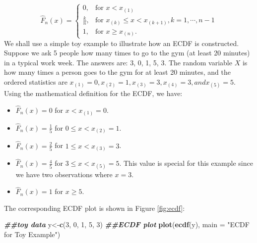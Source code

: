 \documentclass[
]{book}
\newenvironment{Shaded}{\begin{snugshade}}{\end{snugshade}}
\newcommand{\AttributeTok}[1]{\textcolor[rgb]{0.13,0.29,0.53}{#1}}
\newcommand{\DecValTok}[1]{\textcolor[rgb]{0.00,0.00,0.81}{#1}}
\newcommand{\DocumentationTok}[1]{\textcolor[rgb]{0.56,0.35,0.01}{\textbf{\textit{#1}}}}
\newcommand{\FunctionTok}[1]{\textcolor[rgb]{0.13,0.29,0.53}{\textbf{#1}}}
\newcommand{\NormalTok}[1]{#1}
\newcommand{\OtherTok}[1]{\textcolor[rgb]{0.56,0.35,0.01}{#1}}
\newcommand{\StringTok}[1]{\textcolor[rgb]{0.31,0.60,0.02}{#1}}
\providecommand{\tightlist}{%
  \setlength{\itemsep}{0pt}\setlength{\parskip}{0pt}}
\begin{document}
\[
 \hat{F}_n(x) = 
  \begin{cases} 
   0, & \text{for } x < x_{(1)} \\
   \frac{k}{n},       & \text{for } x_{(k)} \leq x < x_{(k+1)}, k = 1, \cdots, n-1\\
   1, & \text{for } x \geq x_{(n)}.
  \end{cases}
\]
We shall use a simple toy example to illustrate how an ECDF is constructed. Suppose we ask 5 people how many times to go to the gym (at least 20 minutes) in a typical work week. The answers are: 3, 0, 1, 5, 3. The random variable \(X\) is how many times a person goes to the gym for at least 20 minutes, and the ordered statistics are \(x_{(1)} = 0, x_{(2)} = 1, x_{(3)} = 3, x_{(4)} = 3, and x_{(5)} = 5\). Using the mathematical definition for the ECDF, we have:

\begin{itemize}
\tightlist
\item
  \(\hat{F}_n(x) = 0\) for \(x < x_{(1)} = 0\).
\item
  \(\hat{F}_n(x) = \frac{1}{5}\) for \(0 \leq x < x_{(2)} = 1\).
\item
  \(\hat{F}_n(x) = \frac{2}{5}\) for \(1 \leq x < x_{(3)} = 3\).
\item
  \(\hat{F}_n(x) = \frac{4}{5}\) for \(3 \leq x < x_{(5)} = 5\). This value is special for this example since we have two observations where \(x=3\).
\item
  \(\hat{F}_n(x) = 1\) for \(x \geq 5\).
\end{itemize}

The corresponding ECDF plot is shown in Figure \ref{fig:ecdf}:

\begin{Shaded}
\begin{Highlighting}[]
\DocumentationTok{\#\#toy data}
\NormalTok{y}\OtherTok{\textless{}{-}}\FunctionTok{c}\NormalTok{(}\DecValTok{3}\NormalTok{, }\DecValTok{0}\NormalTok{, }\DecValTok{1}\NormalTok{, }\DecValTok{5}\NormalTok{, }\DecValTok{3}\NormalTok{)}
\DocumentationTok{\#\#ECDF plot}
\FunctionTok{plot}\NormalTok{(}\FunctionTok{ecdf}\NormalTok{(y), }\AttributeTok{main =} \StringTok{"ECDF for Toy Example"}\NormalTok{)}
\end{Highlighting}
\end{Shaded}
\end{document}

